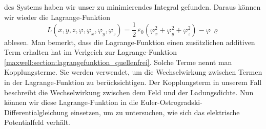 des Systems haben wir unser zu minimierendes Integral gefunden.
Daraus können wir wieder die Lagrange-Funktion
\begin{equation}
L(x,y,z,\varphi,\varphi_x,\varphi_y,\varphi_z)
=
\frac{1}{2}\,\varepsilon_0\left(\varphi_x^2 + \varphi_y^2 + \varphi_z^2\right) - \varphi\,\varrho
\label{maxwell:section:lagrangefunktion_mit_quelle}
\end{equation}
ablesen.
Man bemerkt, dass die Lagrange-Funktion einen zusätzlichen additiven Term erhalten hat im Verlgeich zur Lagrange-Funktion \eqref{maxwell:section:lagrangefunktion_quellenfrei}.
Solche Terme nennt man Kopplungsterme.
Sie werden verwendet, um die Wechselwirkung zwischen Termen in der Lagrange-Funktion zu berücksichtigen.
Der Kopplungsterm in unserem Fall beschreibt die Wechselwirkung zwischen dem Feld und der Ladungsdichte.
Nun können wir diese Lagrange-Funktion in die Euler-Ostrogradski-Differentialgleichung einsetzen, um zu untersuchen, wie sich das elektrische Potentialfeld verhält.

